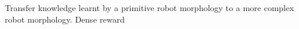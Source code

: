 Transfer knowledge learnt by a primitive robot morphology to a more complex robot morphology.
Dense reward